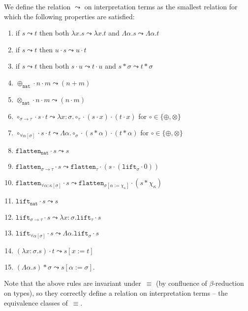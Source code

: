 \documentclass[runningheads,a4paper]{llncs}
\newcommand{\quant}[2]{\forall #1[#2]}
\newcommand{\arrtype}{\rightarrow}
\newcommand{\abs}[2]{\lambda #1.#2}
\newcommand{\tabs}[2]{\Lambda #1.#2}
\newcommand{\app}[2]{#1 \cdot #2}
\newcommand{\tapp}[2]{#1 * #2}
\newcommand{\subst}[2]{#1:=#2}
\newcommand{\nat}{\mathtt{nat}}
\newcommand{\flatten}{\mathtt{flatten}}
\newcommand{\lift}{\mathtt{lift}}
\begin{document}
\begin{definition}
  We define the relation $\leadsto$ on interpretation terms as the
  smallest relation for which the following properties are satisfied:
  \begin{enumerate}
  \item\label{leadsto:mono:abs}
    if $s \leadsto t$ then both $\abs{x}{s} \leadsto \abs{x}{t}$ and
    $\tabs{\alpha}{s} \leadsto \tabs{\alpha}{t}$
  \item\label{leadsto:mono:right}
    if $s \leadsto t$ then $\app{u}{s} \leadsto \app{u}{t}$
  \item\label{leadsto:mono:left}
    if $s \leadsto t$ then both $\app{s}{u} \leadsto \app{t}{u}$ and
    $\tapp{s}{\sigma} \leadsto \tapp{t}{\sigma}$
  \item\label{leadsto:plus:base}
    $\app{\app{\oplus_{\nat}}{n}}{m} \leadsto (n+m)$
  \item\label{leadsto:times:base} $\app{\app{\otimes_{\nat}}{n}}{m}
    \leadsto (n \cdot m)$
  \item\label{leadsto:circ:arrow} $\app{\app{\circ_{\sigma \arrtype
        \tau}}{s}}{t} \leadsto
    \abs{x:\sigma}{\app{\app{\circ_\tau}{(\app{s}{x})}}{(\app{t}{x})}}$
    for $\circ \in \{ \oplus, \otimes \}$
  \item\label{leadsto:circ:forall}
    $\app{\app{\circ_{\quant{\alpha}{\sigma}}}{s}}{t} \leadsto
    \tabs{\alpha}{\app{\app{\circ_\sigma}{(\tapp{s}{\alpha})}}{(
        \tapp{t}{\alpha})}}$ for $\circ \in \{ \oplus, \otimes \}$
  \item $\app{\flatten_\nat}{s} \leadsto s$
  \item $\app{\flatten_{\sigma \arrtype \tau}}{s} \leadsto
    \app{\flatten_\tau}{(\app{s}{(\app{\lift_\sigma}{0})})}$
  \item $\app{\flatten_{\quant{\alpha:\kappa}{\sigma}}}{s} \leadsto
    \app{\flatten_{\sigma[\subst{\alpha}{\chi_\kappa}]}}{(\tapp{s}{\chi_\kappa})}$
  \item $\app{\lift_\nat}{s} \leadsto s$
  \item $\app{\lift_{\sigma \arrtype \tau}}{s} \leadsto
    \abs{x:\sigma}{\app{\lift_{\tau}}{s}}$
  \item $\app{\lift_{\quant{\alpha}{\sigma}}}{s} \leadsto
    \tabs{\alpha}{\app{\lift_{\sigma}}{s}}$
  \item\label{leadsto:beta:abs} $\app{(\abs{x:\sigma}{s})}{t} \leadsto
    s[\subst{x}{t}]$
  \item\label{leadsto:beta:tabs} $\tapp{(\tabs{\alpha}{s})}{\sigma}
    \leadsto s[\subst{\alpha}{\sigma}]$.
  \end{enumerate}
  Note that the above rules are invariant under~$\equiv$ (by
  confluence of $\beta$-reduction on types), so they correctly define
  a relation on interpretation terms -- the equivalence classes
  of~$\equiv$.


\end{definition}
\end{document}

